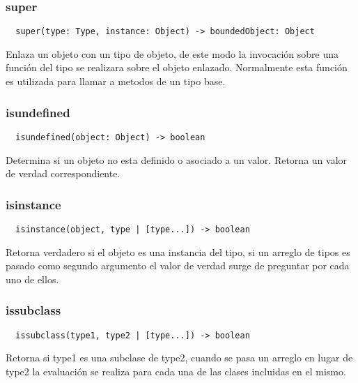\subsubsection*{super}
\begin{verbatim}
  super(type: Type, instance: Object) -> boundedObject: Object
\end{verbatim}
Enlaza un objeto con un tipo de objeto, de este modo la invocación sobre una
función del tipo se realizara sobre el objeto enlazado.
Normalmente esta función es utilizada para llamar a metodos de un tipo base.

\subsubsection*{isundefined}
\begin{verbatim}
  isundefined(object: Object) -> boolean
\end{verbatim}
Determina si un objeto no esta definido o asociado a un valor. Retorna un valor
de verdad correspondiente.

\subsubsection*{isinstance}
\begin{verbatim}
  isinstance(object, type | [type...]) -> boolean
\end{verbatim}
Retorna verdadero si el objeto es una instancia del tipo, si un arreglo de tipos
es pasado como segundo argumento el valor de verdad surge de preguntar por cada
uno de ellos.

\subsubsection*{issubclass}
\begin{verbatim}
  issubclass(type1, type2 | [type...]) -> boolean
\end{verbatim}
Retorna si type1 es una subclase de type2, cuando se pasa un arreglo en lugar de
type2 la evaluación se realiza para cada una de las clases incluidas en el mismo.

